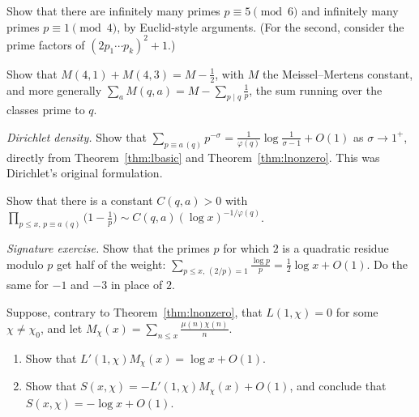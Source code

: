 \begin{exercise}[$\star$]\label{ex:euclid}
Show that there are infinitely many primes $p\equiv5\pmod6$ and infinitely many primes $p\equiv1\pmod4$, by Euclid-style arguments.
(For the second, consider the prime factors of $(2p_1\cdots p_k)^2+1$.)
\end{exercise}

\begin{exercise}[$\star$]\label{ex:constmod4}
Show that $M(4,1)+M(4,3)=M-\frac12$, with $M$ the Meissel--Mertens constant, and more generally $\sum_{a}M(q,a)=M-\sum_{p\mid q}\frac1p$, the sum
running over the classes prime to $q$.
\end{exercise}

\begin{exercise}[$\star\star$]\label{ex:density}
\emph{Dirichlet density.} Show that $\sum_{p\equiv a\,(q)}p^{-\sigma}=\frac1{\varphi(q)}\log\frac1{\sigma-1}+O(1)$ as $\sigma\to1^+$, directly from Theorem~\ref{thm:lbasic} and
Theorem~\ref{thm:lnonzero}. This was Dirichlet's original formulation.
\end{exercise}

\begin{exercise}[$\star\star$]\label{ex:progproduct}
Show that there is a constant $C(q,a)>0$ with $\prod_{p\le x,\,p\equiv a\,(q)}\bigl(1-\frac1p\bigr)\sim C(q,a)(\log x)^{-1/\varphi(q)}$.
\end{exercise}

\begin{exercise}[$\star\star$]\label{ex:two}
\emph{Signature exercise.} Show that the primes $p$ for which $2$ is a quadratic residue modulo $p$ get half of the weight:
$\sum_{p\le x,\,(2/p)=1}\frac{\log p}p=\frac12\log x+O(1)$. Do the same for $-1$ and $-3$ in place of $2$.
\end{exercise}

\begin{exercise}[$\star\star$]\label{ex:ifzero}
Suppose, contrary to Theorem~\ref{thm:lnonzero}, that $L(1,\chi)=0$ for some $\chi\ne\chi_0$, and let $M_\chi(x)=\sum_{n\le x}\frac{\mu(n)\chi(n)}n$.
\begin{enumerate}[label=(\alph*)]
\item Show that $L'(1,\chi)M_\chi(x)=\log x+O(1)$.
\item Show that $S(x,\chi)=-L'(1,\chi)M_\chi(x)+O(1)$, and conclude that $S(x,\chi)=-\log x+O(1)$.
\end{enumerate}
\end{exercise}

